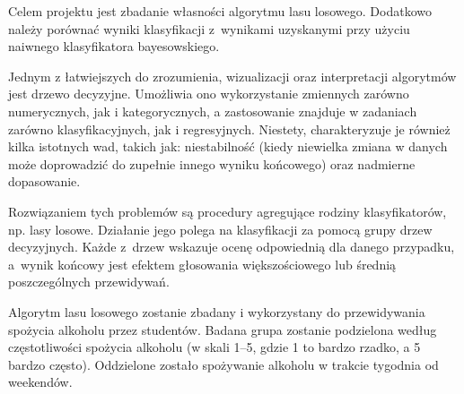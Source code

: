 Celem projektu jest zbadanie własności algorytmu lasu losowego. Dodatkowo należy porównać wyniki klasyfikacji z~wynikami uzyskanymi przy użyciu naiwnego klasyfikatora bayesowskiego.

Jednym z łatwiejszych do zrozumienia, wizualizacji oraz interpretacji algorytmów jest drzewo decyzyjne. Umożliwia ono wykorzystanie zmiennych zarówno numerycznych, jak i
kategorycznych, a zastosowanie znajduje w zadaniach zarówno klasyfikacyjnych, jak i regresyjnych. Niestety, charakteryzuje je również kilka istotnych wad, takich jak: niestabilność (kiedy niewielka zmiana w danych może doprowadzić do zupełnie innego wyniku
końcowego) oraz nadmierne dopasowanie.

Rozwiązaniem tych problemów są procedury agregujące rodziny klasyfikatorów, np. lasy losowe.
Działanie jego polega na klasyfikacji za pomocą grupy drzew decyzyjnych. Każde z~drzew wskazuje
ocenę odpowiednią dla danego przypadku, a~wynik końcowy jest efektem głosowania większościowego lub średnią poszczególnych przewidywań.

Algorytm lasu losowego zostanie zbadany i wykorzystany do przewidywania spożycia alkoholu przez studentów. Badana grupa zostanie podzielona według częstotliwości spożycia alkoholu (w skali 1--5, gdzie 1 to bardzo rzadko, a 5 bardzo często). Oddzielone zostało spożywanie alkoholu w trakcie tygodnia od weekendów.